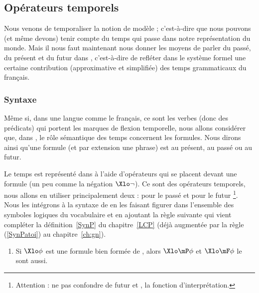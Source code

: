 \fussy




\subsection{Opérateurs temporels}

Nous venons de temporaliser la notion de modèle ;
c'est-à-dire que nous pouvons (et même devons)  tenir compte
du temps qui passe dans notre représentation du monde.  Mais il nous faut
maintenant nous donner les 
moyens de parler du passé, du présent et du futur dans {\LO},
c'est-à-dire de refléter dans le système formel une certaine
contribution (approximative et simplifiée) des temps grammaticaux du
français.  


\subsubsection{Syntaxe}

Même si, dans une langue comme le français, ce sont les verbes (donc des prédicats) qui portent les marques de flexion
temporelle,  nous allons considérer  que, dans {\LO}, le rôle sémantique des
temps concernent les formules.
Nous dirons ainsi qu'une formule (et par extension une phrase) est au présent, au passé ou au futur.

Le temps est représenté dans {\LO} à l'aide d'opérateurs qui se placent
devant une formule (un peu comme la négation $\Xlo\neg$).  Ce sont des
opérateurs temporels, nous allons en utiliser principalement deux : {\Xlo\mP} pour le passé et
{\Xlo\mF} pour le futur%
\footnote{
Attention : ne pas confondre {\Xlo\mF} de futur et \FI, la fonction d'interprétation.}.
Nous les intégrons à la syntaxe de {\LO} en les faisant figurer dans l'ensemble des symboles logiques du vocabulaire et en ajoutant la règle suivante qui vient compléter la définition~\ref{SynP} du chapitre~\ref{LCP} (déjà augmentée par la règle (\RSyn\ref{SynPatoi}) au chapitre~\ref{ch:gn}).

\begin{defi}[Syntaxe de {\mP} et {\mF}]
\begin{enumerate}[resume*=RglSyn1] %
\item Si $\Xlo\phi$ est une formule bien formée de {\LO}, alors $\Xlo\mP \phi$
et $\Xlo\mF \phi$ le sont aussi.
\label{SynPPF}
\setcounter{RglSynt}{\value{enumi}}
\end{enumerate}
\end{defi}


